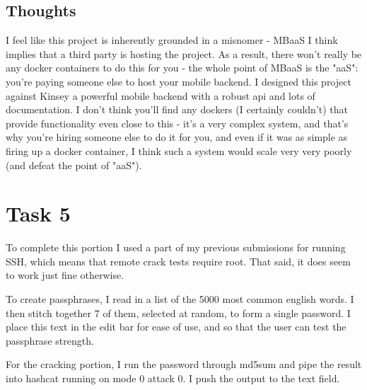 \documentclass{article}
\begin{document}
\subsection{Thoughts}
I feel like this project is inherently grounded in a misnomer - MBaaS I think implies that a third party is hosting the project. As a result, there won't really be any docker containers to do this for you - the whole point of MBaaS is the "aaS": you're paying someone else to host your mobile backend. I designed this project against Kinsey a powerful mobile backend with a robust api and lots of documentation. I don't think you'll find any dockers (I certainly couldn't) that provide functionality even close to this - it's a very complex system, and that's why you're hiring someone else to do it for you, and even if it was as simple as firing up a docker container, I think such a system would scale very very poorly (and defeat the point of "aaS").

\clearpage

\section{Task 5}
To complete this portion I used a part of my previous submissions for running SSH, which means that remote crack tests require root.
That said, it does seem to work just fine otherwise.

To create passphrases, I read in a list of the 5000 most common english words. I then stitch together 7 of them, selected at random, to form a single password. I place this text in the edit bar for ease of use, and so that the user can test the passphrase strength.

For the cracking portion, I run the password through md5sum and pipe the result into hashcat running on mode 0 attack 0. I push the output to the text field.
\end{document}
